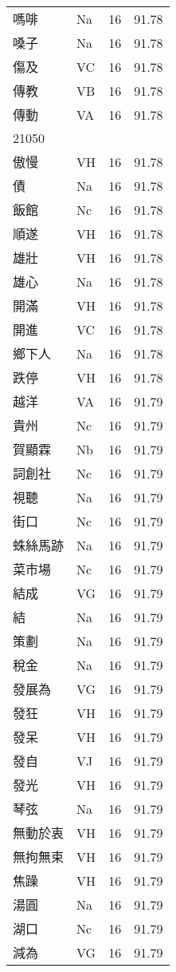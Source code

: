 \documentclass[twocolumn]{book}
\begin{document}
\begin{supertabular}{llrr}
嗎啡 & Na & 16 &  91.78\\
嗓子 & Na & 16 &  91.78\\
傷及 & VC & 16 &  91.78\\
傳教 & VB & 16 &  91.78\\
傳動 & VA & 16 &  91.78\\
21050\\
傲慢 & VH & 16 &  91.78\\
債 & Na & 16 &  91.78\\
飯館 & Nc & 16 &  91.78\\
順遂 & VH & 16 &  91.78\\
雄壯 & VH & 16 &  91.78\\
雄心 & Na & 16 &  91.78\\
開滿 & VH & 16 &  91.78\\
開進 & VC & 16 &  91.78\\
鄉下人 & Na & 16 &  91.78\\
跌停 & VH & 16 &  91.78\\
越洋 & VA & 16 &  91.79\\
貴州 & Nc & 16 &  91.79\\
賀顯霖 & Nb & 16 &  91.79\\
詞創社 & Nc & 16 &  91.79\\
視聽 & Na & 16 &  91.79\\
街口 & Nc & 16 &  91.79\\
蛛絲馬跡 & Na & 16 &  91.79\\
菜市場 & Nc & 16 &  91.79\\
結成 & VG & 16 &  91.79\\
結 & Na & 16 &  91.79\\
策劃 & Na & 16 &  91.79\\
稅金 & Na & 16 &  91.79\\
發展為 & VG & 16 &  91.79\\
發狂 & VH & 16 &  91.79\\
發呆 & VH & 16 &  91.79\\
發自 & VJ & 16 &  91.79\\
發光 & VH & 16 &  91.79\\
琴弦 & Na & 16 &  91.79\\
無動於衷 & VH & 16 &  91.79\\
無拘無束 & VH & 16 &  91.79\\
焦躁 & VH & 16 &  91.79\\
湯圓 & Na & 16 &  91.79\\
湖口 & Nc & 16 &  91.79\\
減為 & VG & 16 &  91.79\\

\end{supertabular}
\end{document}
